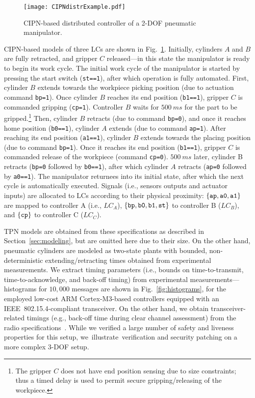 %
\begin{figure}[t]
	\centering
	\texttt{[image: CIPNdistrExample.pdf]}
	\caption{CIPN-based {distributed} controller of a 2-DOF pneumatic manipulator.}
	\label{fig:CIPNdistrCtrl}
\end{figure}
%



CIPN-based models of three LCs are shown in Fig.~\ref{fig:CIPNdistrCtrl}. Initially, cylinders $A$ and $B$ are fully retracted, and gripper $C$ released---in this state the manipulator is ready to begin its work cycle. The initial work cycle of the manipulator is started by pressing the start switch (\verb!st==1!), after which operation is fully automated. First, cylinder $B$ extends towards the workpiece picking position (due to actuation command \verb!bp=1!). Once cylinder $B$ reaches its end position (\verb!b1==1!), gripper $C$ is commanded gripping (\verb!cp=1!). Controller $B$ waits for $500~ms$ for the part to be gripped.\footnote{The gripper $C$ does not have end position sensing due to size constraints; thus a timed delay is used to permit secure gripping/releasing of the workpiece.}
Then, cylinder $B$ retracts (due to command \verb!bp=0!), and once it reaches home position (\verb!b0==1!), cylinder $A$ extends (due to command \verb!ap=1!). After reaching its end position (\verb!a1==1!), cylinder $B$ extends towards the placing position (due to command \verb!bp=1!). Once it reaches its end position (\verb!b1==1!), gripper $C$ is commanded release of the workpiece (command \verb!cp=0!). $500~ms$ later, cylinder B retracts (\verb!bp=0! followed by \verb!b0==1!), after which cylinder $A$ retracts (\verb!ap=0! followed by \verb!a0==1!). The manipulator returnees into its initial state, after which the next cycle is automatically executed. Signals (i.e., sensors outputs and actuator inputs) are allocated to LCs according to their physical proximity: $\{\verb!ap!,\verb!a0!,\verb!a1!\}$ are mapped to controller A (i.e., $LC_A$), $\{\verb!bp!,\verb!b0!,\verb!b1!,\verb!st!\}$ to controller B ($LC_B$), and $\{\verb!cp!\}$ to controller C ($LC_C$).

TPN models are obtained from these specifications as described in Section~\ref{sec:modeling}, but are omitted here due to their size. On the other hand, pneumatic cylinders are modeled as two-state plants with bounded, non-deterministic extending/retracting times obtained from experimental measurements. We extract timing parameters (i.e., bounds on time-to-transmit, time-to-acknowledge, and back-off timing) from experimental measurements---histograms for $10,000$ messages are shown in Fig.~\ref{fig:histograms}, for the employed low-cost ARM Cortex-M3-based controllers equipped with an IEEE~802.15.4-compliant transceiver. On the other hand, we obtain transceiver-related timings (e.g., back-off time during clear channel assessment) from the radio specifications~\cite{mrf}. While we verified a large number of safety and liveness properties for this setup, we~illustrate~verification and security patching on a more complex 3-DOF setup.

